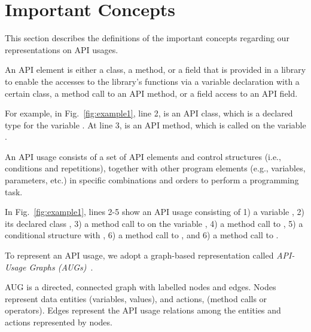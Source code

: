 \section{Important Concepts}
\label{sec:concepts}

This section describes the definitions of the important concepts
regarding our representations on API usages.


\begin{Definition}
An API element is either a class, a method, or a field that is
provided in a library to enable the accesses to the library's
functions via a variable declaration with a certain class, a method
call to an API method, or a field access to an API field.
\end{Definition}

For example, in Fig.~\ref{fig:example1}, line 2,  is
an API class, which is a declared type for the variable
. At line 3,  is an API
method, which is called on the variable .

\begin{Definition}
An API usage consists of a set of API elements and control structures
(i.e., conditions and repetitions), together with other program
elements (e.g., variables, parameters, etc.) in specific combinations
and orders to perform a programming task.
\end{Definition}

In Fig.~\ref{fig:example1}, lines 2-5 show an API usage consisting of
1) a variable , 2) its declared class
, 3) a method call to  on the
variable , 4) a method call to , 5)
a conditional structure with , 6) a method call to
, and 6) a method call to
.

To represent an API usage, we adopt a graph-based representation
called {\em API-Usage Graphs (AUGs)}~\cite{msr19}.

\begin{Definition}
AUG is a directed, connected graph with labelled nodes and
edges. Nodes represent data entities (variables, values), and actions,
(method calls or operators). Edges represent the API usage
relations among the entities and actions represented by nodes.
\end{Definition}

